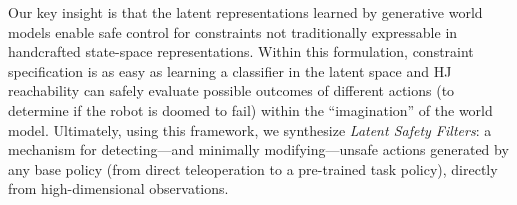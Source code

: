 Our key insight is that the latent representations learned by generative world models \cite{hafner2020dreamerv2, zhou2024dinowm} enable safe control for constraints not traditionally expressable in handcrafted state-space representations. 
Within this formulation, constraint specification is as easy as learning a classifier in the latent space and HJ reachability can safely evaluate possible outcomes of different actions (to determine if the robot is doomed to fail) within the ``imagination'' of the world model. 
Ultimately, using this framework, we synthesize \textit{Latent Safety Filters}: a mechanism for detecting---and minimally modifying---unsafe actions generated by any base policy (from direct teleoperation to a pre-trained task policy), directly from high-dimensional observations. 




